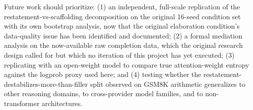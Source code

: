\documentclass[11pt,letterpaper]{article}
\begin{document}
Future work should prioritize: (1) an independent, full-scale replication of the restatement-vs-scaffolding decomposition on the original 16-seed condition set with its own bootstrap analysis, now that the original elaboration condition's data-quality issue has been identified and documented; (2) a formal mediation analysis on the now-available raw completion data, which the original research design called for but which no iteration of this project has yet executed; (3) replicating with an open-weight model to compare true attention-weight entropy against the logprob proxy used here; and (4) testing whether the restatement-destabilizes-more-than-filler split observed on GSM8K arithmetic generalizes to other reasoning domains, to cross-provider model families, and to non-transformer architectures.



\end{document}

